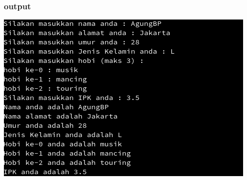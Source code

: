 \documentclass[a4paper,12pt]{article}
\begin{document}
\subsubsection{output}
\begin{center}
    \includegraphics[scale=.7]{prog12.png} 
\end{center}
\end{document}
